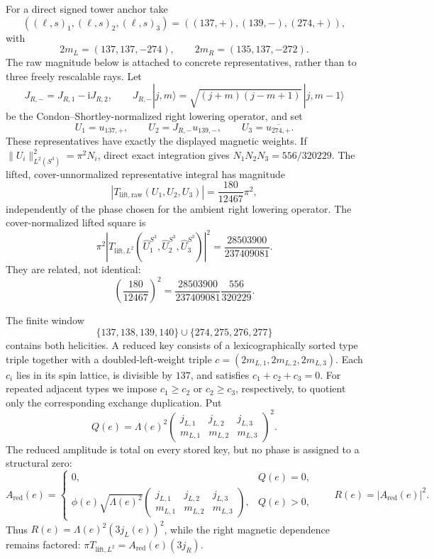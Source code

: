 \documentclass[12pt]{article}
\theoremstyle{definition}
\theoremstyle{remark}
\newcommand{\ii}{\mathrm i}
\begin{document}
For a direct signed tower anchor take
\[
 ((\ell,s)_1,(\ell,s)_2,(\ell,s)_3)
 =((137,+),(139,-),(274,+)),
\]
with
\[
 2m_L=(137,137,-274),\qquad 2m_R=(135,137,-272).
\]
The raw magnitude below is attached to concrete representatives, rather than to
three freely rescalable rays.  Let
\[
 J_{R,-}=J_{R,1}-\ii J_{R,2},\qquad
 J_{R,-}|j,m\rangle=\sqrt{(j+m)(j-m+1)}\,|j,m-1\rangle
\]
be the Condon--Shortley-normalized right lowering operator, and set
\[
 U_1=u_{137,+},\qquad U_2=J_{R,-}u_{139,-},\qquad
 U_3=\overline{u_{274,+}}.
\]
These representatives have exactly the displayed magnetic weights.  If
$\|U_i\|_{L^2(S^3)}^2=\pi^2N_i$, direct exact integration gives
$N_1N_2N_3=556/320229$.  The lifted, cover-unnormalized representative
integral has magnitude
\[
 \left|T_{\mathrm{lift,raw}}(U_1,U_2,U_3)\right|=\frac{180}{12467}\pi^2,
\]
independently of the phase chosen for the ambient right lowering operator.
The cover-normalized lifted square is
\[
 \pi^2\left|T_{\mathrm{lift},L^2}
 (\widehat U_1^{S^3},\widehat U_2^{S^3},\widehat U_3^{S^3})\right|^2
 =\frac{28503900}{237409081}.
\]
They are related, not identical:
\begin{equation}\label{eq:anchor-conversion}
 \left(\frac{180}{12467}\right)^2
 =\frac{28503900}{237409081}\frac{556}{320229}.
\end{equation}

The finite window
\[
 \{137,138,139,140\}\cup\{274,275,276,277\}
\]
contains both helicities.  A reduced key consists of a lexicographically
sorted type triple together with a doubled-left-weight triple
$c=(2m_{L,1},2m_{L,2},2m_{L,3})$.  Each $c_i$ lies in its spin lattice, is
divisible by $137$, and satisfies $c_1+c_2+c_3=0$.  For repeated adjacent
types we impose $c_1\ge c_2$ or $c_2\ge c_3$, respectively, to quotient only
the corresponding exchange duplication.  Put
\[
 Q(e)=\Lambda(e)^2
 \begin{pmatrix}j_{L,1}&j_{L,2}&j_{L,3}\\
                 m_{L,1}&m_{L,2}&m_{L,3}\end{pmatrix}^{\!2}.
\]
The reduced amplitude is total on every stored key, but no phase is assigned
to a structural zero:
\[
 A_{\mathrm{red}}(e)=
 \begin{cases}
  0,&Q(e)=0,\\
  \displaystyle\phi(e)\sqrt{\Lambda(e)^2}
  \begin{pmatrix}j_{L,1}&j_{L,2}&j_{L,3}\\
                  m_{L,1}&m_{L,2}&m_{L,3}\end{pmatrix},&Q(e)>0,
 \end{cases}
 \qquad
 R(e)=|A_{\mathrm{red}}(e)|^2.
\]
Thus $R(e)=\Lambda(e)^2(3j_L(e))^2$, while the right magnetic dependence
remains factored:
$\pi T_{\mathrm{lift},L^2}=A_{\mathrm{red}}(e)(3j_R)$.
\end{document}
